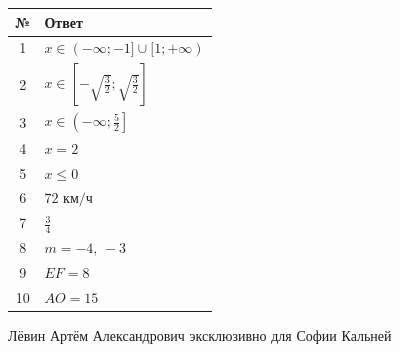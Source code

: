 \documentclass[a4paper,12pt]{article}
\begin{document}
\renewcommand{\arraystretch}{1.5}

\begin{center}

\begin{tabularx}{\linewidth}{@{}cX@{}}

\toprule
\textbf{№} & \textbf{Ответ} \\
\midrule

1 &
\(
x\in(-\infty;-1]\cup[1;+\infty)
\)
\\

2 &
\(
x\in
\left[
-\sqrt{\frac32};
\sqrt{\frac32}
\right]
\)
\\

3 &
\(
x\in
\left(
-\infty;
\frac52
\right]
\)
\\

4 &
\(
x=2
\)
\\

5 &
\(
x\le0
\)
\\

6 &
\(
72\text{ км/ч}
\)
\\

7 &
\(
\frac34
\)
\\

8 &
\(
m=-4,\,-3
\)
\\

9 &
\(
EF=8
\)
\\

10 &
\(
AO=15
\)
\\

\bottomrule

\end{tabularx}

\end{center}

\vfill

\begin{center}
{\small\color{darkaccent}
Лёвин Артём Александрович эксклюзивно для Софии Кальней
}
\end{center}
\end{document}

